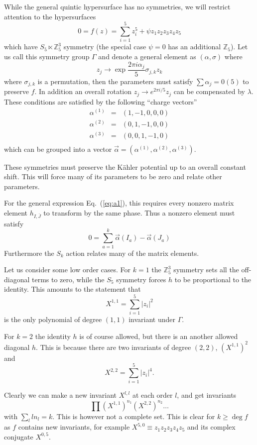 \documentclass[12pt]{article}
\def\IZ{\mathbb{Z}}
\newcommand{\eq}[1]{Eq.~(\ref{eq:#1})}
\newcommand{\be}{\begin{equation}}
\newcommand{\ee}{\end{equation}}
\newcommand{\bea}{\begin{eqnarray}}
\newcommand{\eea}{\end{eqnarray}}
\def\bJ{{\bar{J}}}
\begin{document}
{{{{While the general quintic hypersurface has no symmetries, we will restrict attention to the
hypersurfaces
\be
0 = f(z) = \sum_{i=1}^5 z_i^5 + \psi z_1z_2z_3z_4z_5
\ee
which have $S_5 \ltimes \IZ_5^3$ symmetry (the special case $\psi=0$ has an additional $\IZ_5$).
Let us call this symmetry group $\Gamma$ and denote a general  element as $(\alpha,\sigma)$ where
\be
z_j \rightarrow \exp \frac{2\pi i\alpha_j}{5} \sigma_{j,k} z_k 
\ee
where $\sigma_{j,k}$ is a permutation, then the parameters must satisfy $\sum \alpha_j=0 (5)$ to
preserve $f$.  In addition an overall rotation $z_j\rightarrow e^{2\pi i/5}z_j$ can be compensated
by $\lambda$.   These conditions are satisfied by the following ``charge vectors'' 
\bea
\alpha^{(1)} &=& ( 1, -1, 0, 0, 0 ) \\
\alpha^{(2)} &=& ( 0, 1, -1, 0, 0 ) \\
\alpha^{(3)} &=& ( 0, 0, 1, -1, 0 ) \\
\eea
which can be grouped into a vector $\vec \alpha=(\alpha^{(1)},\alpha^{(2)},\alpha^{(3)})$.

These symmetries must preserve the K\"ahler potential up to an overall constant shift.
This will force many of its parameters to be zero and relate other parameters.

For the general expression  \eq{a1}, this requires every nonzero matrix element $h_{I,\bJ}$ to
transform by the same phase.  Thus a nonzero element must satisfy
\be
0 = \sum_{a=1}^k {\vec \alpha}( I_a ) - {\vec \alpha}( J_a ) 
\ee
Furthermore the $S_k$ action relates many of the matrix elements.

Let us consider some low order cases.  For $k=1$ the $\IZ_5^3$ symmetry sets all the off-diagonal
terms to zero, while the $S_5$ symmetry forces $h$ to be proportional to the identity.
This amounts to the statement that 
\be
X^{1,1} = \sum_{i=1}^5 |z_i|^2
\ee
is the only polynomial of degree $(1,1)$ invariant under $\Gamma$.

For $k=2$ the identity $h$ is of course allowed, but there is an another allowed diagonal $h$.
This is because there are two invariants of degree $(2,2)$, $(X^{1,1})^2$ and
\be
X^{2,2} = \sum_{i=1}^5 |z_i|^4 .
\ee

Clearly we can make a new invariant $X^{l,l}$ at each order $l$, and get invariants 
\be
\prod (X^{1,1})^{n_1}  (X^{2,2})^{n_2} \ldots
\ee
with $\sum_l l n_l = k$.  This is however not a complete set.  This is clear for $k\ge \deg f$
as $f$ contains new invariants, for example $X^{5,0}\equiv z_1z_2z_3z_4z_5$ and its
complex conjugate $X^{0,5}$.

}}}}
\end{document}
